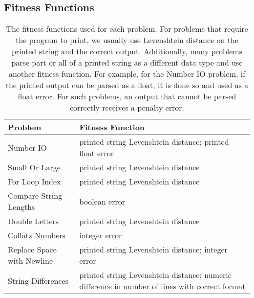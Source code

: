 \documentclass{sig-alternate}
\begin{document}
\subsection{Fitness Functions}

\begin{table*}[t]
\centering
\caption{The fitness functions used for each problem. For problems that require the program to print, we usually use Levenshtein distance on the printed string and the correct output. Additionally, many problems parse part or all of a printed string as a different data type and use another fitness function. For example, for the Number IO problem, if the printed output can be parsed as a float, it is done so and used as a float error. For such problems, an output that cannot be parsed correctly receives a penalty error.}
\label{tableFitnessFunctions}
\begin{tabular}{>{\raggedright}p{4cm} >{\raggedright}p{11cm}}
\toprule
\textbf{Problem}               & \textbf{Fitness Function}                                                                                                                        \tabularnewline
\midrule
Number IO                  & printed string Levenshtein distance; printed float error                                                                              \tabularnewline
Small Or Large             & printed string Levenshtein distance                                                                                                   \tabularnewline
For Loop Index             & printed string Levenshtein distance                                                                                                   \tabularnewline
Compare String Lengths     & boolean error                                                                                                                  \tabularnewline
Double Letters             & printed string Levenshtein distance                                                                                                   \tabularnewline
Collatz Numbers            & integer error                                                                                                                  \tabularnewline
Replace Space with Newline & printed string Levenshtein distance; integer error                                                                                    \tabularnewline
String Differences         & printed string Levenshtein distance; numeric difference in number of lines with correct format                                                \tabularnewline

\end{tabular}
\end{table*}
\end{document}
